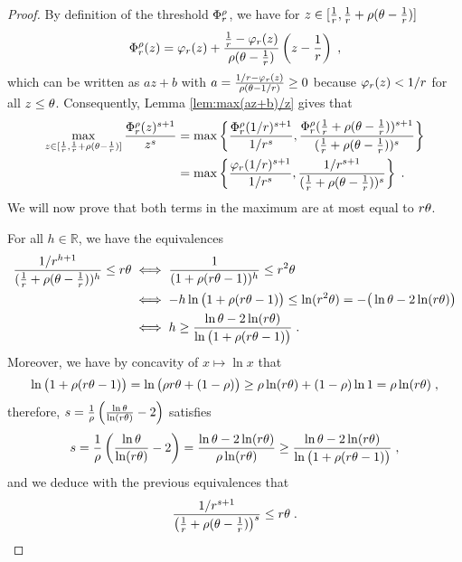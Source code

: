 \begin{proof}
By definition of the threshold $\Phi^\rho_r$, we have for $z \in [\frac{1}{r}, \frac{1}{r}+\rho(\theta-\frac{1}{r})]$ \[ \Phi^\rho_r(z) = \varphi_r(z) + \frac{\frac{1}{r} - \varphi_r(z)}{\rho(\theta-\frac{1}{r})}\left(z-\frac{1}{r}\right)\;, \]
which can be written as $az+b$ with $a = \frac{1/r - \varphi_r(z)}{\rho(\theta-1/r)} \geq 0$ because $\varphi_r(z) < 1/r$ for all $z \leq \theta$. Consequently, Lemma \ref{lem:max(az+b)/z} gives that
\begin{align}
\max_{z \in [\frac{1}{r}, \frac{1}{r}+\rho(\theta-\frac{1}{r})]} \frac{\Phi^\rho_r(z)^{s+1}}{z^{s}} 
&= \max\left\{ \frac{\Phi^\rho_r(1/r)^{s+1}}{1/r^{s}}, \frac{\Phi^\rho_r(\frac{1}{r}+\rho(\theta-\frac{1}{r}))^{s+1}}{(\frac{1}{r}+\rho(\theta-\frac{1}{r}))^{s}} \right\} \nonumber \\
&= \max\left\{ \frac{\varphi_r(1/r)^{s+1}}{1/r^{s}}, \frac{1/r^{s+1}}{(\frac{1}{r}+\rho(\theta-\frac{1}{r}))^{s}} \right\}\;. \label{aligneq:max2terms}
\end{align}
We will now prove that both terms in the maximum are at most equal to $r \theta$.

For all $h \in \mathbb{R}$, we have the equivalences
\begin{align*}
\frac{1/r^{h+1}}{(\frac{1}{r}+\rho(\theta-\frac{1}{r}))^{h}} \leq r \theta
&\iff \frac{1}{(1+\rho(r \theta - 1))^h} \leq r^2\theta\\
&\iff -h \ln\big(1+\rho(r \theta - 1)\big) \leq \ln (r^2 \theta) = - \big(\ln\theta - 2 \ln(r\theta) \big)\\
&\iff h \geq \frac{\ln\theta - 2\ln(r\theta)}{\ln\big(1+\rho(r \theta - 1)\big)}\;.
\end{align*}
Moreover, we have by concavity of $x \mapsto \ln x$ that
\[
\ln\big(1+\rho(r \theta - 1)\big)
= \ln\big(\rho r\theta + (1-\rho)\big) \geq \rho \ln(r \theta) + (1-\rho) \ln 1 = \rho \ln (r \theta)\;,
\]
therefore, $s = \frac{1}{\rho}\left( \frac{\ln \theta}{\ln(r \theta)}-2\right)$ satisfies 
\[
s 
= \frac{1}{\rho}\left( \frac{\ln \theta}{\ln(r \theta)}-2\right)
=  \frac{\ln \theta - 2 \ln(r\theta)}{\rho\ln(r \theta)}
\geq \frac{\ln\theta - 2\ln(r\theta)}{\ln\big(1+\rho(r \theta - 1)\big)}\;,
\]
and we deduce with the previous equivalences that 
\begin{equation}\label{eq:max2terms_term1}
\frac{1/r^{s+1}}{\left(\frac{1}{r}+\rho(\theta-\frac{1}{r})\right)^{s}} \leq r \theta\;. 
\end{equation}



\end{proof}
